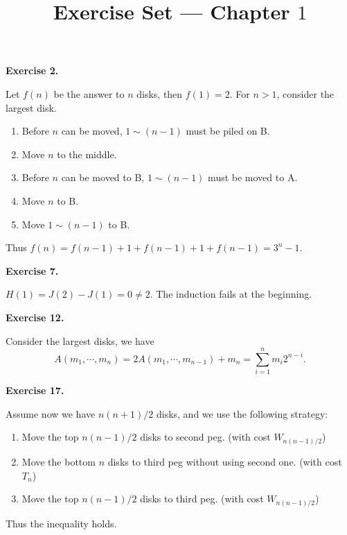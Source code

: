 \documentclass[a4paper]{article}
\title{Exercise Set --- Chapter $1$}
\date{}
\newenvironment{exercise}[1]{
	\par
	\noindent\textbf{Exercise #1.}\quad
}{
	\par
	\bigskip
}
\begin{document}
\maketitle

\begin{exercise}{2}
    Let $f(n)$ be the answer to $n$ disks, then $f(1)=2$. For $n>1$, consider the largest disk.
    \begin{enumerate}
        \item Before $n$ can be moved, $1\sim (n-1)$ must be piled on B.
        \item Move $n$ to the middle.
        \item Before $n$ can be moved to B, $1\sim (n-1)$ must be moved to A.
        \item Move $n$ to B.
        \item Move $1\sim (n-1)$ to B.
    \end{enumerate}
    Thus $f(n)=f(n-1)+1+f(n-1)+1+f(n-1)=3^n-1$.
\end{exercise}

\begin{exercise}{7}
    $H(1)=J(2)-J(1)=0\neq 2$. The induction fails at the beginning.
\end{exercise}

\begin{exercise}{12}
    Consider the largest disks, we have
    $$
    A(m_1,\cdots,m_n)=2A(m_1,\cdots,m_{n-1})+m_n=\sum_{i=1}^nm_i2^{n-i}.
    $$
\end{exercise}

\begin{exercise}{17}
    Assume now we have $n(n+1)/2$ disks, and we use the following strategy:
    \begin{enumerate}
        \item Move the top $n(n-1)/2$ disks to second peg. (with cost $W_{n(n-1)/2}$)
        \item Move the bottom $n$ disks to third peg without using second one. (with cost $T_n$)
        \item Move the top $n(n-1)/2$ disks to third peg. (with cost $W_{n(n-1)/2}$)
    \end{enumerate}
    Thus the inequality holds.
\end{exercise}
\end{document}
